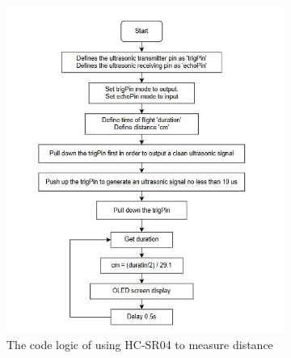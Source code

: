 \begin{figure}[H] %
    \centering 
    \captionsetup{labelsep=colon}
    \begin{subfigure}{0.55\textwidth} %
        \centering
        \includegraphics[width=\linewidth]{Image/Design/code_logic_tof.jpg}
        \caption{\centering The code logic of using HC-SR04 to measure distance}
        \label{fig:cl_tof}
    \end{subfigure}
    \begin{subfigure}{0.40\textwidth} %
        \centering

\end{subfigure}
\end{figure}
